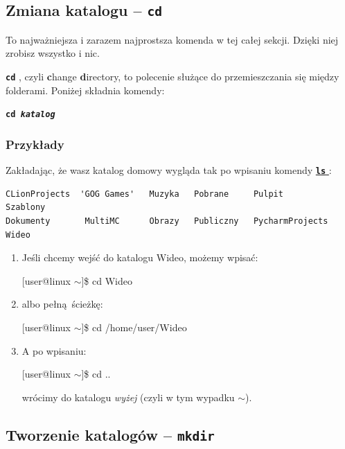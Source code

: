 \documentclass[11pt, a4paper]{article}
\makeatletter
\newcommand{\ttbf}[1]{
    \texttt{\textbf{#1}}
}
\newenvironment{console1}[1][$\sim$]
{
    \begin{tcolorbox}
    \ttfamily
    \fontseries{b}
    \selectfont
    {[}user@linux #1{]}\$ } {
    
    \end{tcolorbox}

}
\makeatother
\begin{document}
\subsection{Zmiana katalogu -- \ttbf{cd}}
\label{sec:cd}

To najważniejsza i zarazem najprostsza komenda w tej całej sekcji. Dzięki niej zrobisz wszystko i nic.

\ttbf{cd}, czyli \textbf{c}hange \textbf{d}irectory, to polecenie służące do przemieszczania się między folderami. Poniżej składnia komendy:

\ttbf{cd \emph{katalog}}

\subsubsection{Przykłady}

Zakładając, że wasz katalog domowy wygląda tak po wpisaniu komendy \hyperref[sec:ls]{\ttbf{ls}}:

\begin{verbatim}
CLionProjects  'GOG Games'   Muzyka   Pobrane     Pulpit            Szablony
Dokumenty       MultiMC      Obrazy   Publiczny   PycharmProjects   Wideo
\end{verbatim}

\begin{enumerate}
    \item Jeśli chcemy wejść do katalogu Wideo, możemy wpisać:

    \begin{console1}
        cd Wideo
    \end{console1}

    \item albo pełną ścieżkę:

    \begin{console1}
        cd /home/user/Wideo
    \end{console1}

    \item A po wpisaniu:

    \begin{console1}
        cd ..
    \end{console1}
    
    wrócimy do katalogu \emph{wyżej} (czyli w tym wypadku $\sim$).
\end{enumerate}

\subsection{Tworzenie katalogów -- \ttbf{mkdir}}
\end{document}
